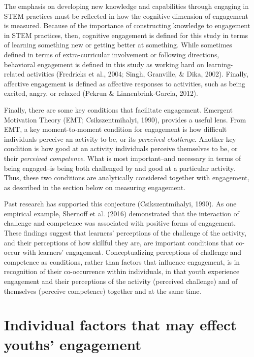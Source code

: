 \documentclass[]{book}
\theoremstyle{definition}
\theoremstyle{definition}
\theoremstyle{definition}
\theoremstyle{remark}
\begin{document}
The emphasis on developing new knowledge and capabilities through
engaging in STEM practices must be reflected in how the cognitive
dimension of engagement is measured. Because of the importance of
constructing knowledge to engagement in STEM practices, then, cognitive
engagement is defined for this study in terms of learning something new
or getting better at something. While sometimes defined in terms of
extra-curricular involvement or following directions, behavioral
engagement is defined in this study as working hard on learning-related
activities (Fredricks et al., 2004; Singh, Granville, \& Dika, 2002).
Finally, affective engagement is defined as affective responses to
activities, such as being excited, angry, or relaxed (Pekrun \&
Linnenbrink-Garcia, 2012).

Finally, there are some key conditions that facilitate engagement.
Emergent Motivation Theory (EMT; Csikszentmihalyi, 1990), provides a
useful lens. From EMT, a key moment-to-moment condition for engagement
is how difficult individuals perceive an activity to be, or its
\emph{perceived challenge}. Another key condition is how good at an
activity individuals perceive themselves to be, or their \emph{perceived
competence}. What is most important--and necessary in terms of being
engaged--is being both challenged by and good at a particular activity.
Thus, these two conditions are analytically considered together with
engagement, as described in the section below on measuring engagement.

Past research has supported this conjecture (Csikszentmihalyi, 1990). As
one empirical example, Shernoff et al. (2016) demonstrated that the
interaction of challenge and competence was associated with positive
forms of engagement. These findings suggest that learners' perceptions
of the challenge of the activity, and their perceptions of how skillful
they are, are important conditions that co-occur with learners'
engagement. Conceptualizing perceptions of challenge and competence as
conditions, rather than factors that influence engagement, is in
recognition of their co-occurrence within individuals, in that youth
experience engagement and their perceptions of the activity (perceived
challenge) and of themselves (perceive competence) together and at the
same time.

\section{Individual factors that may effect youths'
engagement}\label{individual-factors-that-may-effect-youths-engagement}
\end{document}

